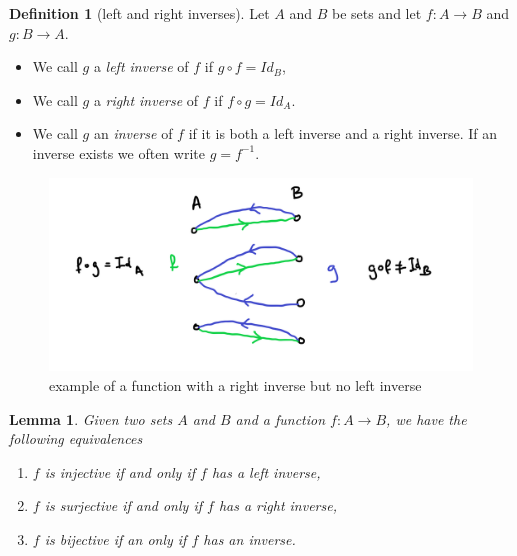 \documentclass[
]{book}
\newtheorem{lemma}{Lemma}[chapter]
\theoremstyle{definition}
\newtheorem{definition}{Definition}[chapter]
\theoremstyle{definition}
\theoremstyle{definition}
\theoremstyle{definition}
\theoremstyle{remark}
\begin{document}
\begin{definition}[left and right inverses]

Let \(A\) and \(B\) be sets and let \(f: A \rightarrow B\) and \(g: B \rightarrow A\).

\begin{itemize}
\item
  We call \(g\) a \emph{left inverse} of \(f\) if \(g\circ f = Id_B\),
\item
  We call \(g\) a \emph{right inverse} of \(f\) if \(f\circ g = Id_A\).
\item
  We call \(g\) an \emph{inverse} of \(f\) if it is both a left inverse and a right inverse. If an inverse exists we often write \(g = f^{-1}\).
\end{itemize}

\end{definition}

\begin{figure}
\centering
\includegraphics{leftrightinverse.png}
\caption{\label{fig:unnamed-chunk-20}example of a function with a right inverse but no left inverse}
\end{figure}

\begin{lemma}

Given two sets \(A\) and \(B\) and a function \(f: A \rightarrow B\), we have the following equivalences

\begin{enumerate}
\def\labelenumi{\arabic{enumi}.}
\item
  \(f\) is injective if and only if \(f\) has a left inverse,
\item
  \(f\) is surjective if and only if \(f\) has a right inverse,
\item
  \(f\) is bijective if an only if \(f\) has an inverse.
\end{enumerate}

\end{lemma}
\end{document}
